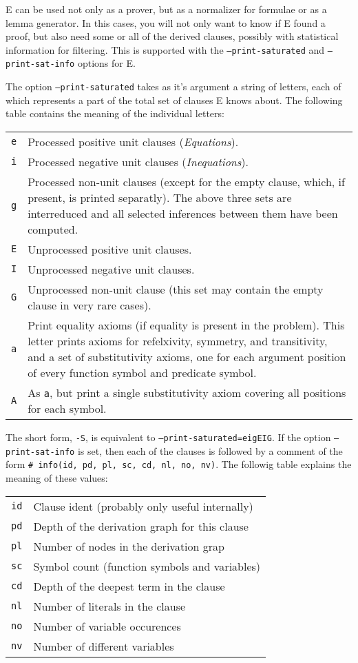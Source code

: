 \documentclass{article}
\begin{document}
E can be used not only as a prover, but as a normalizer for formulae
or as a lemma generator. In this cases, you will not only want to know
if E found a proof, but also need some or all of the derived clauses,
possibly with statistical information for filtering. This is supported
with the \texttt{--print-saturated} and \texttt{--print-sat-info}
options for E.

The option \texttt{--print-saturated} takes as it's argument a string
of letters, each of which represents a part of the total set of
clauses E knows about. The following table contains the meaning of the
individual letters:

\begin{tabular}{lp{9cm}}
  \texttt{e} & Processed positive unit clauses (\emph{Equations}).\\ 
  \texttt{i} & Processed negative unit clauses (\emph{Inequations}).\\ 
  \texttt{g} & Processed non-unit clauses (except for the empty
  clause, which, if present, is printed separatly). The above three
  sets are interreduced and all selected inferences between them have
  been computed.\\ 
  \texttt{E} & Unprocessed positive unit clauses.\\ 
  \texttt{I} & Unprocessed negative unit clauses.\\ 
  \texttt{G} & Unprocessed non-unit clause (this set may contain the
  empty clause in very rare cases).\\ 
  \texttt{a} & Print equality axioms (if equality is present in the
  problem). This letter prints axioms for refelxivity, symmetry, and
  transitivity, and a set of substitutivity axioms, one for each
  argument position of every function symbol and predicate symbol.\\
  \texttt{A} & As \texttt{a}, but print a single substitutivity axiom
  covering all positions for each symbol.\\
\end{tabular}

The short form, \texttt{-S}, is equivalent to
\texttt{--print-saturated=eigEIG}. If the option
\texttt{--print-sat-info} is set, then each of the clauses is followed
by a comment of the form \texttt{\# info(id, pd, pl, sc, cd, nl,
  no, nv)}. The followig table explains the meaning of these values:

\begin{tabular}{lp{10cm}}
\texttt{id} & Clause ident (probably only useful internally) \\
\texttt{pd} & Depth of the derivation graph for this clause \\
\texttt{pl} & Number of nodes in the derivation grap \\
\texttt{sc} & Symbol count (function symbols and variables) \\
\texttt{cd} & Depth of the deepest term in the clause \\
\texttt{nl} & Number of literals in the clause \\
\texttt{no} & Number of variable occurences \\
\texttt{nv} & Number of different variables \\
\end{tabular}
\end{document}
